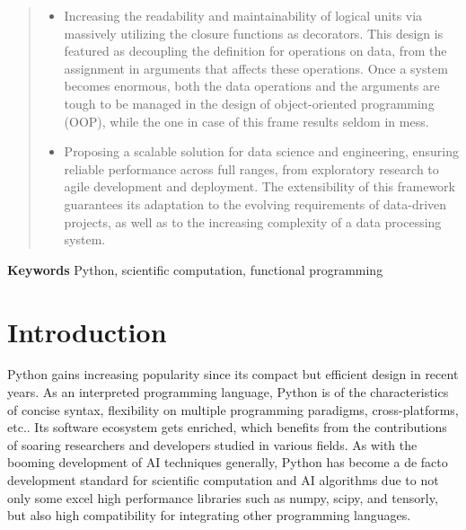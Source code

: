 \documentclass[a4paper,12pt]{article}
\newcommand{\mycite}[1]{{\color{black}\cite{#1}}}
\begin{document}
\begin{abstract}
\begin{itemize}
\item[3)]
Increasing the readability and maintainability of logical units via massively utilizing the closure functions as decorators. This design is featured as decoupling the definition for operations on data, from the assignment in arguments that affects these operations. Once a system becomes enormous, both the data operations and the arguments are tough to be managed in the design of object-oriented programming (OOP), while the one in case of this frame results seldom in mess.

\item[4)]
Proposing a scalable solution for data science and engineering, ensuring reliable performance across full ranges, from exploratory research to agile development and deployment. The extensibility of this framework guarantees its adaptation to the evolving requirements of data-driven projects, as well as to the increasing complexity of a data processing system.
\end{itemize}
\end{abstract}

\noindent\textbf{Keywords} Python, scientific computation, functional programming


\section*{Introduction}

Python gains increasing popularity since its compact but efficient design in recent years. As an interpreted programming language, Python is of the characteristics  of concise  syntax, flexibility on  multiple programming paradigms, cross-platforms, etc.\mycite{munawar2022impact, beazley2009python, summerfield2009programming}. Its software ecosystem gets enriched, which benefits from the  contributions of soaring researchers and developers studied in various fields. As with the booming development of AI techniques generally, Python has become a de facto development standard for scientific computation and AI algorithms due to not only some excel high performance libraries such as numpy, scipy, and tensorly\mycite{harris2020array, virtanen2020scipy, jean2019tensorly}, but also high compatibility for integrating other programming languages.\par
\end{document}
